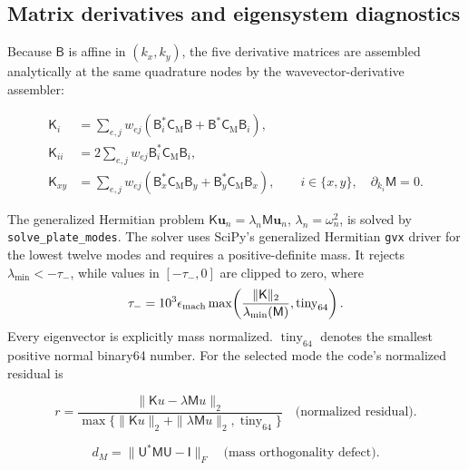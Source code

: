 \subsection{Matrix derivatives and eigensystem diagnostics}

Because \(\mathsf B\) is affine in \((k_x,k_y)\), the five derivative
matrices are assembled analytically at the same quadrature nodes by the
wavevector-derivative assembler:

\begin{equation}
 \begin{aligned}
 \mathsf K_i&=\sum_{e,j}w_{ej}
 (\mathsf B_i^*\mathsf C_{\mathrm M}\mathsf B
 +\mathsf B^*\mathsf C_{\mathrm M}\mathsf B_i),\\
 \mathsf K_{ii}&=2\sum_{e,j}w_{ej}
 \mathsf B_i^*\mathsf C_{\mathrm M}\mathsf B_i,\\
 \mathsf K_{xy}&=\sum_{e,j}w_{ej}
 (\mathsf B_x^*\mathsf C_{\mathrm M}\mathsf B_y
 +\mathsf B_y^*\mathsf C_{\mathrm M}\mathsf B_x),
 \qquad i\in\{x,y\},\quad \partial_{k_i}\mathsf M=0.
 \end{aligned}
 \label{eq:wavevector-matrix-derivatives}
\end{equation}

The generalized Hermitian problem
\(\mathsf K\boldsymbol u_n=\lambda_n\mathsf M\boldsymbol u_n\),
\(\lambda_n=\omega_n^2\), is solved by \texttt{solve\_plate\_modes}.
The solver uses SciPy's generalized Hermitian \texttt{gvx} driver for the
lowest twelve modes and requires a positive-definite mass.  It rejects
\(\lambda_{\min}<-\tau_-\), while values in \([-\tau_-,0]\) are clipped to
zero, where
\[
 \tau_-=10^3\epsilon_{\rm mach}
 \max\!\left(\frac{\|\mathsf K\|_2}{\lambda_{\min}(\mathsf M)},
 \operatorname{tiny}_{64}\right).
\]
Every eigenvector is explicitly mass normalized.
\(\operatorname{tiny}_{64}\) denotes the smallest positive normal binary64
number.  For the selected mode the code's normalized residual is

\begin{equation}
 r=\frac{\|\mathsf Ku-\lambda\mathsf Mu\|_2}
 {\max\{\|\mathsf Ku\|_2+\|\lambda\mathsf Mu\|_2,
 \operatorname{tiny}_{64}\}}
 \quad\text{(normalized residual)}.
 \label{eq:normalized-eigen-residual}
\end{equation}

\begin{equation}
 d_M=\|\mathsf U^*\mathsf M\mathsf U-\mathsf I\|_F
 \quad\text{(mass orthogonality defect)}.
 \label{eq:mass-orthogonality-defect}
\end{equation}

